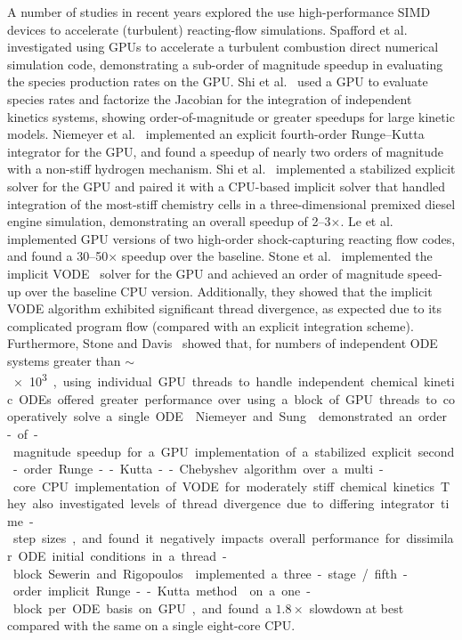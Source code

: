 \documentclass[preprint]{elsarticle}
\begin{document}
A number of studies in recent years explored the use high-performance SIMD devices to accelerate (turbulent) reacting-flow simulations.
Spafford et al.~\cite{Spafford:2010aa} investigated using GPUs to accelerate a turbulent combustion direct numerical simulation code, demonstrating a sub-order of magnitude speedup in evaluating the species production rates on the GPU.
Shi et al.~\cite{Shi:2011aa} used a GPU to evaluate species rates and factorize the Jacobian for the integration of independent kinetics systems, showing order-of-magnitude or greater speedups for large kinetic models.
Niemeyer et al.~\cite{Niemeyer:2011aa} implemented an explicit fourth-order Runge--Kutta integrator for the GPU, and found a speedup of nearly two orders of magnitude with a non-stiff hydrogen mechanism.
Shi et al.~\cite{Shi:2012aa} implemented a stabilized explicit solver for the GPU and paired it with a CPU-based implicit solver that handled integration of the most-stiff chemistry cells in a three-dimensional premixed diesel engine simulation, demonstrating an overall speedup of \numrange{2}{3}$\times$.
Le et al.~\cite{Le2013596} implemented GPU versions of two high-order shock-capturing reacting flow codes, and found a \numrange{30}{50}$\times$ speedup over the baseline.
Stone et al.~\cite{Stone:2013aa} implemented the implicit VODE~\cite{Brown:1989vl} solver for the GPU and achieved an order of magnitude speed-up over the baseline CPU version.
Additionally, they showed that the implicit VODE algorithm exhibited significant thread divergence, as expected due to its complicated program flow (compared with an explicit integration scheme).
Furthermore, Stone and Davis~\cite{Stone:2013aa} showed that, for numbers of independent ODE systems greater than $\sim$\SI{e3}, using individual GPU threads to handle independent chemical kinetic ODEs offered greater performance over using a block of GPU threads to cooperatively solve a single ODE~\cite{Stone:2013aa}.
Niemeyer and Sung~\cite{Niemeyer:2014aa} demonstrated an order-of-magnitude speedup for a GPU implementation of a stabilized explicit second-order Runge--Kutta--Chebyshev algorithm over a multi-core CPU implementation of VODE for moderately stiff chemical kinetics.
They also investigated levels of thread divergence due to differing integrator time-step sizes, and found it negatively impacts overall performance for dissimilar ODE initial conditions in a thread-block.
Sewerin and Rigopoulos~\cite{Sewerin20151375} implemented a three-stage\slash fifth-order implicit Runge--Kutta method~\cite{wanner1991solving} on a one-block per ODE basis on GPU, and found a $1.8\times$ slowdown at best compared with the same on a single eight-core CPU.
\end{document}
